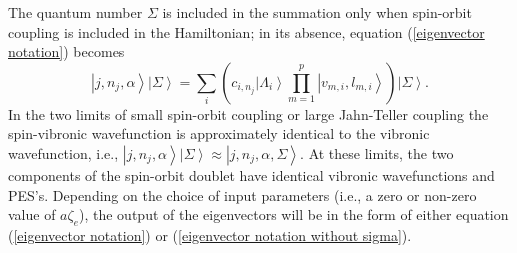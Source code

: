 \documentclass{article}
\begin{document}
The quantum number $\Sigma $ is
included in the summation only when spin-orbit coupling is included in the Hamiltonian;
in its absence, equation (\ref{eigenvector notation}) becomes
\begin{equation}
\left| j,n_{j},\alpha \right\rangle \left| \Sigma \right\rangle =
\sum_{i}\left( c_{i,n_{j} }\left| \Lambda _{i}\right\rangle 
\prod\limits_{m=1}^{p}\left| v_{m,i},l_{m,i}\right\rangle  \right) 
\left| \Sigma \right\rangle . \label{eigenvector notation without sigma}
\end{equation}
In the two limits of small spin-orbit coupling or large Jahn-Teller coupling
the spin-vibronic wavefunction is approximately identical to the
vibronic wavefunction, i.e.,  
$\left| j,n_{j},\alpha \right\rangle \left| \Sigma \right\rangle \approx 
\left| j,n_{j},\alpha ,\Sigma \right\rangle $.
At these limits, the two components of the spin-orbit doublet have
identical vibronic wavefunctions and PES's. Depending on the choice of
input parameters (i.e., a zero or non-zero value of $a\zeta _e$), the
output of the eigenvectors will be in the form of either equation
(\ref{eigenvector notation}) or (\ref{eigenvector notation without sigma}).
\end{document}
